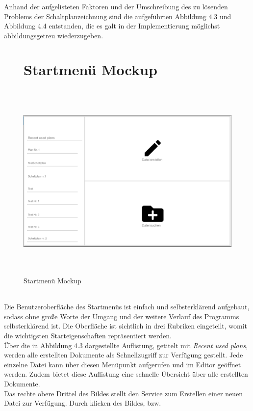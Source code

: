 Anhand der aufgelisteten Faktoren und der 
Umschreibung des zu lösenden Problems der 
Schaltplanzeichnung sind die aufgeführten Abbildung
4.3 und Abbildung 4.4 entstanden, die es galt in der Implementierung möglichst abbildungsgetreu wiederzugeben.
\pagebreak
\begin{figure}[htb]
    \section*{Startmenü Mockup}
    \centering
    \includegraphics[width=15cm,height=10cm]{4Systementwurf/Bilder/StartMenuViewMockUp}
    \caption{Startmenü Mockup}
    \label{StartMenuViewMockUp}
\end{figure}
\\Die Benutzeroberfläche des Startmenüs ist einfach und selbsterklärend aufgebaut, sodass ohne große Worte der Umgang 
und der weitere Verlauf des Programms selbsterklärend ist. Die Oberfläche ist sichtlich in drei Rubriken eingeteilt, womit 
die wichtigsten Starteigenschaften 
repräsentiert werden.
\\
\linebreak
Über die in Abbildung 4.3 dargestellte Auflistung, getitelt mit \textit{Recent used plans}, werden alle erstellten Dokumente als Schnellzugriff zur
Verfügung gestellt. Jede einzelne Datei kann über diesen Menüpunkt aufgerufen und im Editor geöffnet werden. Zudem bietet diese Auflistung 
eine schnelle Übersicht über alle erstellten Dokumente. 
\\
\linebreak
Das rechte obere Drittel des Bildes stellt den Service zum Erstellen einer neuen Datei zur Verfügung. Durch klicken des Bildes, bzw. 

